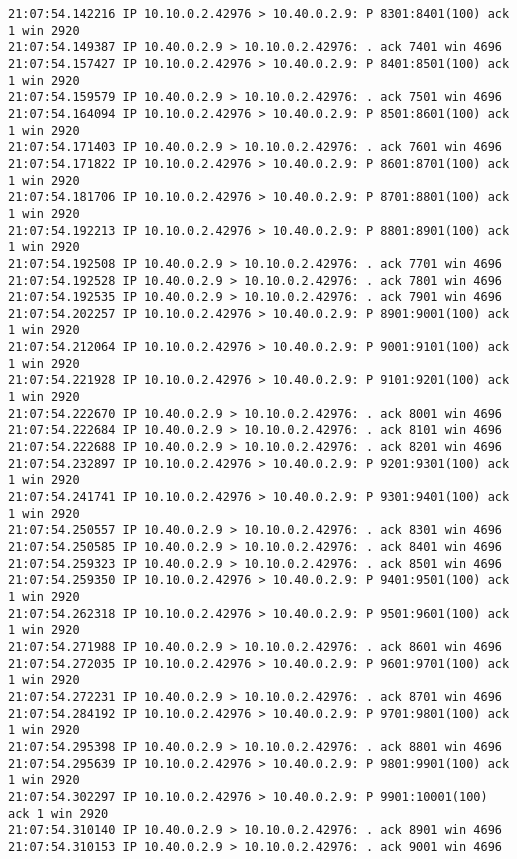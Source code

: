 \documentclass[a4paper,12pt]{article}
\begin{document}
\begin{Verbatim}
21:07:54.142216 IP 10.10.0.2.42976 > 10.40.0.2.9: P 8301:8401(100) ack 1 win 2920 
21:07:54.149387 IP 10.40.0.2.9 > 10.10.0.2.42976: . ack 7401 win 4696 
21:07:54.157427 IP 10.10.0.2.42976 > 10.40.0.2.9: P 8401:8501(100) ack 1 win 2920 
21:07:54.159579 IP 10.40.0.2.9 > 10.10.0.2.42976: . ack 7501 win 4696 
21:07:54.164094 IP 10.10.0.2.42976 > 10.40.0.2.9: P 8501:8601(100) ack 1 win 2920 
21:07:54.171403 IP 10.40.0.2.9 > 10.10.0.2.42976: . ack 7601 win 4696 
21:07:54.171822 IP 10.10.0.2.42976 > 10.40.0.2.9: P 8601:8701(100) ack 1 win 2920 
21:07:54.181706 IP 10.10.0.2.42976 > 10.40.0.2.9: P 8701:8801(100) ack 1 win 2920 
21:07:54.192213 IP 10.10.0.2.42976 > 10.40.0.2.9: P 8801:8901(100) ack 1 win 2920 
21:07:54.192508 IP 10.40.0.2.9 > 10.10.0.2.42976: . ack 7701 win 4696 
21:07:54.192528 IP 10.40.0.2.9 > 10.10.0.2.42976: . ack 7801 win 4696 
21:07:54.192535 IP 10.40.0.2.9 > 10.10.0.2.42976: . ack 7901 win 4696 
21:07:54.202257 IP 10.10.0.2.42976 > 10.40.0.2.9: P 8901:9001(100) ack 1 win 2920 
21:07:54.212064 IP 10.10.0.2.42976 > 10.40.0.2.9: P 9001:9101(100) ack 1 win 2920 
21:07:54.221928 IP 10.10.0.2.42976 > 10.40.0.2.9: P 9101:9201(100) ack 1 win 2920 
21:07:54.222670 IP 10.40.0.2.9 > 10.10.0.2.42976: . ack 8001 win 4696 
21:07:54.222684 IP 10.40.0.2.9 > 10.10.0.2.42976: . ack 8101 win 4696 
21:07:54.222688 IP 10.40.0.2.9 > 10.10.0.2.42976: . ack 8201 win 4696 
21:07:54.232897 IP 10.10.0.2.42976 > 10.40.0.2.9: P 9201:9301(100) ack 1 win 2920 
21:07:54.241741 IP 10.10.0.2.42976 > 10.40.0.2.9: P 9301:9401(100) ack 1 win 2920 
21:07:54.250557 IP 10.40.0.2.9 > 10.10.0.2.42976: . ack 8301 win 4696 
21:07:54.250585 IP 10.40.0.2.9 > 10.10.0.2.42976: . ack 8401 win 4696 
21:07:54.259323 IP 10.40.0.2.9 > 10.10.0.2.42976: . ack 8501 win 4696 
21:07:54.259350 IP 10.10.0.2.42976 > 10.40.0.2.9: P 9401:9501(100) ack 1 win 2920 
21:07:54.262318 IP 10.10.0.2.42976 > 10.40.0.2.9: P 9501:9601(100) ack 1 win 2920 
21:07:54.271988 IP 10.40.0.2.9 > 10.10.0.2.42976: . ack 8601 win 4696 
21:07:54.272035 IP 10.10.0.2.42976 > 10.40.0.2.9: P 9601:9701(100) ack 1 win 2920 
21:07:54.272231 IP 10.40.0.2.9 > 10.10.0.2.42976: . ack 8701 win 4696 
21:07:54.284192 IP 10.10.0.2.42976 > 10.40.0.2.9: P 9701:9801(100) ack 1 win 2920 
21:07:54.295398 IP 10.40.0.2.9 > 10.10.0.2.42976: . ack 8801 win 4696 
21:07:54.295639 IP 10.10.0.2.42976 > 10.40.0.2.9: P 9801:9901(100) ack 1 win 2920 
21:07:54.302297 IP 10.10.0.2.42976 > 10.40.0.2.9: P 9901:10001(100) ack 1 win 2920 
21:07:54.310140 IP 10.40.0.2.9 > 10.10.0.2.42976: . ack 8901 win 4696 
21:07:54.310153 IP 10.40.0.2.9 > 10.10.0.2.42976: . ack 9001 win 4696 

\end{Verbatim}
\end{document}
